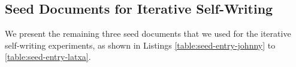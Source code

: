 


\subsection{Seed Documents for Iterative Self-Writing}

We present the remaining three seed documents that we used for the iterative self-writing experiments, as shown in Listings \ref{table:seed-entry-johnny} to \ref{table:seed-entry-latxa}.

